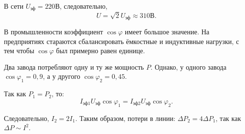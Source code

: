 	\begin{remark}
        В сети \( U_{\textit{эф}} = 220 \)В, следовательно,
        \[
            U = \sqrt{2}U_{\textit{эф}} \approx 310\text{В}.
        \]
	\end{remark}
	
	В промышленности коэффициент \( \cos\varphi \) имеет большое значение.
    На предприятиях стараются сбалансировать ёмкостные и индуктивные нагрузки,
    с тем чтобы \( \cos\varphi \) был примерно равен единице.
	
	\begin{example}
        Два завода потребляют одну и ту же мощность \( P \). Однако, у одного
        завода \( \cos\varphi_1 = 0,9 \), а у другого
        \( \cos\varphi_2 = 0,45 \).
        
        Так как \( P_1 = P_2 \), то:
        \[
            I_{\textit{эф}1}U_{\textit{эф}}\cos\varphi_1 = 
            I_{\textit{эф}2}U_{\textit{эф}}\cos\varphi_2.
        \]
        
        Следовательно, \( I_2 = 2I_1 \). Таким образом, потери в линии:
        \( \Delta P_2 = 4\Delta P_1 \), так как \( \Delta P \sim I^2 \).
	\end{example}
